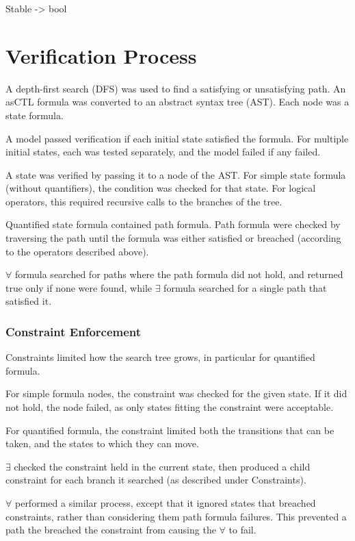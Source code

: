 \documentclass[a4paper,11pt]{article}
\begin{document}
	Stable -> bool
	
	\section{Verification Process}
	A depth-first search (DFS) was used to find a satisfying or unsatisfying path. An asCTL formula was converted to an abstract syntax tree (AST). Each node was a state formula. 
	
	A model passed verification if each initial state satisfied the formula. For multiple initial states, each was tested separately, and the model failed if any failed.
	
	A state was verified by passing it to a node of the AST. For simple state formula (without quantifiers), the condition was checked for that state. For logical operators, this required recursive calls to the branches of the tree.
	
	Quantified state formula contained path formula. Path formula were checked by traversing the path until the formula was either satisfied or breached (according to the operators described above).
	
	$\forall$ formula searched for paths where the path formula did not hold, and returned true only if none were found, while $\exists$ formula searched for a single path that satisfied it.
	
	\subsubsection{Constraint Enforcement}
	Constraints limited how the search tree grows, in particular for quantified formula. 
	
	For simple formula nodes, the constraint was checked for the given state. If it did not hold, the node failed, as only states fitting the constraint were acceptable.
	
	For quantified formula, the constraint limited both the transitions that can be taken, and the states to which they can move. 
	
	$\exists$ checked the constraint held in the current state, then produced a child constraint for each branch it searched (as described under Constraints).
	
	$\forall$ performed a similar process, except that it ignored states that breached constraints, rather than considering them path formula failures. This prevented a path the breached the constraint from causing the $\forall$ to fail.
	
\end{document}
